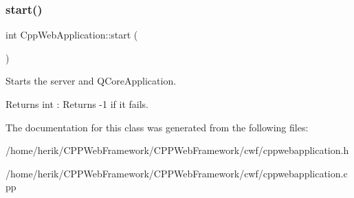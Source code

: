 \subsubsection{\texorpdfstring{start()}{start()}}
{\footnotesize\ttfamily int Cpp\+Web\+Application\+::start (\begin{DoxyParamCaption}{ }\end{DoxyParamCaption})}



Starts the server and Q\+Core\+Application. 

\begin{DoxyReturn}{Returns}
int \+: Returns -\/1 if it fails. 
\end{DoxyReturn}


The documentation for this class was generated from the following files\+:\begin{DoxyCompactItemize}
\item 
/home/herik/\+C\+P\+P\+Web\+Framework/\+C\+P\+P\+Web\+Framework/cwf/cppwebapplication.\+h\item 
/home/herik/\+C\+P\+P\+Web\+Framework/\+C\+P\+P\+Web\+Framework/cwf/cppwebapplication.\+cpp\end{DoxyCompactItemize}
